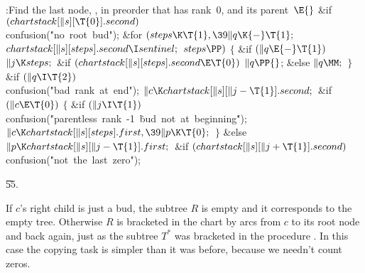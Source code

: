 \Y\B\4:Find the last node, , in preorder that has rank~0, and its
parent~\X${}\E{}$\6
\&{if} ${}(\\{chartstack}[\|s][\T{0}].\\{second}){}$\1\5
\\{confusion}(\.{"no\ root\ bud"});\2\6
\&{for} ${}(\\{steps}\K\T{1},\39\|q\K{-}\T{1};{}$ ${}\\{chartstack}[\|s][%
\\{steps}].\\{second}\I\\{sentinel};{}$ ${}\\{steps}\PP){}$\5
${}\{{}$\1\6
\&{if} ${}(\|q\E{-}\T{1}){}$\1\5
${}\|j\K\\{steps};{}$\2\6
\&{if} ${}(\\{chartstack}[\|s][\\{steps}].\\{second}\E\T{0}){}$\1\5
${}\|q\PP{}$;\5
\2\&{else}\1\5
${}\|q\MM;{}$\2\6
\4${}\}{}$\2\6
\&{if} ${}(\|q\I\T{2}){}$\1\5
\\{confusion}(\.{"bad\ rank\ at\ end"});\2\6
${}\|c\K\\{chartstack}[\|s][\|j-\T{1}].\\{second};{}$\6
\&{if} ${}(\|c\E\T{0}){}$\5
${}\{{}$\1\6
\&{if} ${}(\|j\I\T{1}){}$\1\5
\\{confusion}(\.{"parentless\ rank\ -1\ }\)\.{bud\ not\ at\ beginning}\)\.{"});%
\2\6
${}\|c\K\\{chartstack}[\|s][\\{steps}].\\{first},\39\|p\K\T{0};{}$\6
\4${}\}{}$\5
\2\&{else}\1\5
${}\|p\K\\{chartstack}[\|s][\|j-\T{1}].\\{first};{}$\2\6
\&{if} ${}(\\{chartstack}[\|s][\|j+\T{1}].\\{second}){}$\1\5
\\{confusion}(\.{"not\ the\ last\ zero"});\2\par
\U55.\fi

If $c$'s right child is just a bud, the subtree
$R$ is empty and
it corresponds to the empty tree. Otherwise $R$ is bracketed in
the chart by arcs from $c$ to its root node and back again,
just as the subtree $T^*$ was bracketed in the procedure .
In this case the copying task is simpler than it was before, because
we needn't count zeros.

